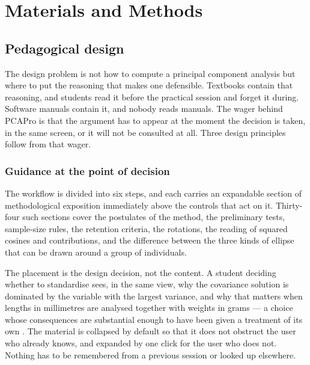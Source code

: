 \documentclass[12pt]{article}
\begin{document}
\section{Materials and Methods}

\subsection{Pedagogical design}

The design problem is not how to compute a principal component analysis but
where to put the reasoning that makes one defensible. Textbooks contain that
reasoning, and students read it before the practical session and forget it
during. Software manuals contain it, and nobody reads manuals. The wager behind
PCAPro is that the argument has to appear at the moment the decision is taken,
in the same screen, or it will not be consulted at all. Three design principles
follow from that wager.

\subsubsection{Guidance at the point of decision}

The workflow is divided into six steps, and each carries an expandable section
of methodological exposition immediately above the controls that act on it.
Thirty-four such sections cover the postulates of the method, the preliminary
tests, sample-size rules, the retention criteria, the rotations, the reading of
squared cosines and contributions, and the difference between the three kinds of
ellipse that can be drawn around a group of individuals.

The placement is the design decision, not the content. A student deciding
whether to standardise sees, in the same view, why the covariance solution is
dominated by the variable with the largest variance, and why that matters when
lengths in millimetres are analysed together with weights in grams --- a choice
whose consequences are substantial enough to have been given a treatment of its
own \citep{brereton2025}. The material
is collapsed by default so that it does not obstruct the user who already knows,
and expanded by one click for the user who does not. Nothing has to be
remembered from a previous session or looked up elsewhere.

\end{document}
